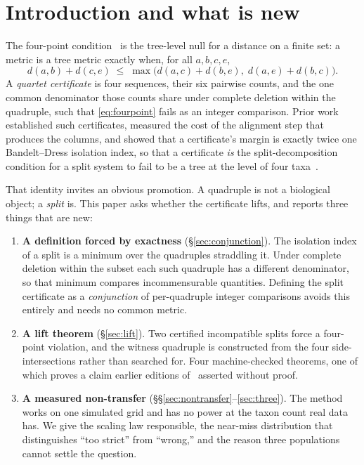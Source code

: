 \documentclass[11pt,a4paper]{article}
\theoremstyle{definition}
\theoremstyle{remark}
\begin{document}
\begin{abstract}
We conclude that the binding constraint is not the statistic but the alignment
admissibility gate, which leaves three of ten populations usable with a single
negative control. One negative control cannot separate ``this method
false-positives'' from ``that population's prior is wrong.'' The next step for
this line is more admissible negative controls, not another statistic.
\end{abstract}

\section{Introduction and what is new}\label{sec:intro}

The four-point condition~\cite{buneman} is the tree-level null for a distance on
a finite set: a metric is a tree metric exactly when, for all $a,b,c,e$,
\begin{equation}\label{eq:fourpoint}
  d(a,b) + d(c,e) \;\le\; \max\bigl(d(a,c)+d(b,e),\; d(a,e)+d(b,c)\bigr).
\end{equation}
A \emph{quartet certificate} is four sequences, their six pairwise counts, and
the one common denominator those counts share under complete deletion within the
quadruple, such that \eqref{eq:fourpoint} fails as an integer comparison. Prior
work established such certificates, measured the cost of the alignment step that
produces the columns, and showed that a certificate's margin is exactly twice one
Bandelt--Dress isolation index, so that a certificate \emph{is} the
split-decomposition condition for a split system to fail to be a tree at the
level of four taxa~\cite{paperf}.

That identity invites an obvious promotion. A quadruple is not a biological
object; a \emph{split} is. This paper asks whether the certificate lifts, and
reports three things that are new:

\begin{enumerate}
\item \textbf{A definition forced by exactness} (\S\ref{sec:conjunction}). The
isolation index of a split is a minimum over the quadruples straddling it. Under
complete deletion within the subset each such quadruple has a different
denominator, so that minimum compares incommensurable quantities. Defining the
split certificate as a \emph{conjunction} of per-quadruple integer comparisons
avoids this entirely and needs no common metric.
\item \textbf{A lift theorem} (\S\ref{sec:lift}). Two certified incompatible
splits force a four-point violation, and the witness quadruple is constructed
from the four side-intersections rather than searched for. Four machine-checked
theorems, one of which proves a claim earlier editions of~\cite{paperf} asserted
without proof.
\item \textbf{A measured non-transfer} (\S\S\ref{sec:nontransfer}--\ref{sec:three}).
The method works on one simulated grid and has no power at the taxon count real
data has. We give the scaling law responsible, the near-miss distribution that
distinguishes ``too strict'' from ``wrong,'' and the reason three populations
cannot settle the question.
\end{enumerate}
\end{document}
